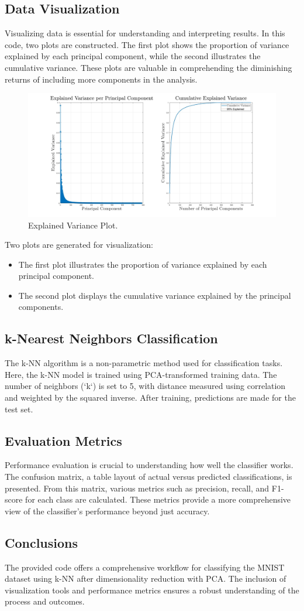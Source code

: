 \subsection{Data Visualization}
Visualizing data is essential for understanding and interpreting results. In this code, two plots are constructed. The first plot shows the proportion of variance explained by each principal component, while the second illustrates the cumulative variance. These plots are valuable in comprehending the diminishing returns of including more components in the analysis.
\begin{figure}[h]
    \centering
    \includegraphics[width=1\textwidth]{PCA_KNN.jpg}
    \caption{Explained Variance Plot.}
    \label{fig:my_label} %
\end{figure}
Two plots are generated for visualization:
\begin{itemize}
    \item The first plot illustrates the proportion of variance explained by each principal component.
    \item The second plot displays the cumulative variance explained by the principal components.
\end{itemize}
\subsection{k-Nearest Neighbors Classification}
The k-NN algorithm is a non-parametric method used for classification tasks. Here, the k-NN model is trained using PCA-transformed training data. The number of neighbors (`k`) is set to 5, with distance measured using correlation and weighted by the squared inverse. After training, predictions are made for the test set.

\subsection{Evaluation Metrics}
Performance evaluation is crucial to understanding how well the classifier works. The confusion matrix, a table layout of actual versus predicted classifications, is presented. From this matrix, various metrics such as precision, recall, and F1-score for each class are calculated. These metrics provide a more comprehensive view of the classifier's performance beyond just accuracy.

\subsection{Conclusions}
The provided code offers a comprehensive workflow for classifying the MNIST dataset using k-NN after dimensionality reduction with PCA. The inclusion of visualization tools and performance metrics ensures a robust understanding of the process and outcomes.


